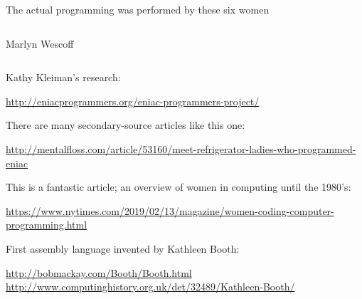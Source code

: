 \documentclass[aspectratio=169]{beamer}
\begin{document}
\begin{frame}{The actual programming was performed by these six women}
\begin{columns}[t]
\begin{center}
Marlyn Wescoff
\end{center}
\end{columns}

\scriptsize
\vspace{0.3 cm}
Kathy Kleiman's research:

\vspace{0.1 cm}
\textcolor{blue}{\url{http://eniacprogrammers.org/eniac-programmers-project/}}

\vspace{0.2 cm}
There are many secondary-source articles like this one:

\vspace{0.1 cm}
\textcolor{blue}{\url{http://mentalfloss.com/article/53160/meet-refrigerator-ladies-who-programmed-eniac}}

\vspace{0.2 cm}
This is a fantastic article; an overview of women in computing until the 1980's:

\vspace{0.1 cm}
\textcolor{blue}{\url{https://www.nytimes.com/2019/02/13/magazine/women-coding-computer-programming.html}}

\vspace{0.2 cm}
First assembly language invented by Kathleen Booth:

\vspace{0.1 cm}
\textcolor{blue}{\url{http://bobmackay.com/Booth/Booth.html}}
\textcolor{blue}{\url{http://www.computinghistory.org.uk/det/32489/Kathleen-Booth/}}
\end{frame}
\end{document}
